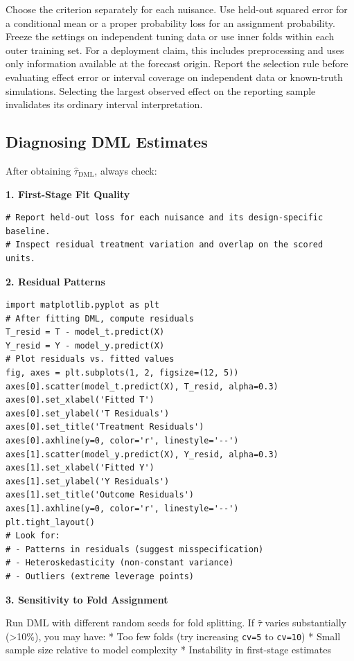 Choose the criterion separately for each nuisance. Use held-out squared
error for a conditional mean or a proper probability loss for an assignment
probability. Freeze the settings on independent tuning data or use inner
folds within each outer training set. For a deployment claim, this includes
preprocessing and uses only information available at the forecast origin.
Report the selection rule before evaluating effect error or interval
coverage on independent data or known-truth simulations. Selecting the
largest observed effect on the reporting sample invalidates its ordinary
interval interpretation.

\subsection{Diagnosing DML Estimates}\label{_diagnosing_dml_estimates}

After obtaining \(\hat{\tau}_{\text{DML}}\), always check:

\textbf{1. First-Stage Fit Quality}

\begin{verbatim}
# Report held-out loss for each nuisance and its design-specific baseline.
# Inspect residual treatment variation and overlap on the scored units.
\end{verbatim}

\textbf{2. Residual Patterns}

\begin{verbatim}
import matplotlib.pyplot as plt
# After fitting DML, compute residuals
T_resid = T - model_t.predict(X)
Y_resid = Y - model_y.predict(X)
# Plot residuals vs. fitted values
fig, axes = plt.subplots(1, 2, figsize=(12, 5))
axes[0].scatter(model_t.predict(X), T_resid, alpha=0.3)
axes[0].set_xlabel('Fitted T')
axes[0].set_ylabel('T Residuals')
axes[0].set_title('Treatment Residuals')
axes[0].axhline(y=0, color='r', linestyle='--')
axes[1].scatter(model_y.predict(X), Y_resid, alpha=0.3)
axes[1].set_xlabel('Fitted Y')
axes[1].set_ylabel('Y Residuals')
axes[1].set_title('Outcome Residuals')
axes[1].axhline(y=0, color='r', linestyle='--')
plt.tight_layout()
# Look for:
# - Patterns in residuals (suggest misspecification)
# - Heteroskedasticity (non-constant variance)
# - Outliers (extreme leverage points)
\end{verbatim}

\textbf{3. Sensitivity to Fold Assignment}

Run DML with different random seeds for fold splitting. If
\(\hat{\tau}\) varies substantially (\textgreater10\%), you may have: *
Too few folds (try increasing \texttt{cv=5} to \texttt{cv=10}) * Small
sample size relative to model complexity * Instability in first-stage
estimates

